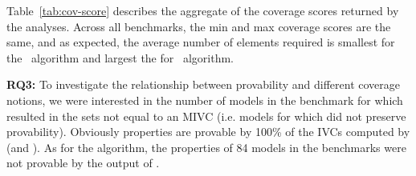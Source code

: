 

Table~\ref{tab:cov-score} describes the aggregate of the coverage scores returned by the analyses.  Across all benchmarks, the min and max coverage scores are the same, and as expected, the average number of elements required is smallest for the \mustalg\ algorithm and largest the for \ucalg\ algorithm.



\textbf{RQ3:}
To investigate the relationship between provability and different coverage notions,
we were interested in the number of models in the benchmark for which
\mustalg resulted in the sets not equal to an MIVC (i.e. models for which
\mustalg did not preserve provability).
Obviously properties are provable by 100\% of the IVCs computed by \ucalg (and \ucbfalg).
As for the \mustalg algorithm, the properties of 84 models in the benchmarks were not provable by the output of \mustalg.



